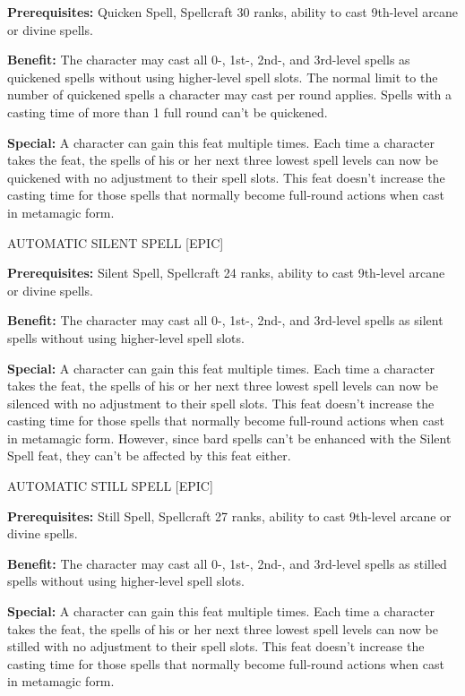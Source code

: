 \documentclass{article}
\begin{document}
\textbf{Prerequisites:} Quicken Spell, Spellcraft 30 ranks, ability to cast 9th-level 
arcane or divine spells. 

\textbf{Benefit:} The character may cast all 0-, 1st-, 2nd-, and 3rd-level spells 
as quickened spells without using higher-level spell slots. The normal limit to 
the number of quickened spells a character may cast per round applies. Spells with 
a casting time of more than 1 full round can't be quickened. 

\textbf{Special:} A character can gain this feat multiple times. Each time a character 
takes the feat, the spells of his or her next three lowest spell levels can now 
be quickened with no adjustment to their spell slots. This feat doesn't increase 
the casting time for those spells that normally become full-round actions when 
cast in metamagic form. 

\vspace{12pt}
AUTOMATIC SILENT SPELL [EPIC] 

\textbf{Prerequisites:} Silent Spell, Spellcraft 24 ranks, ability to cast 9th-level 
arcane or divine spells. 

\textbf{Benefit:} The character may cast all 0-, 1st-, 2nd-, and 3rd-level spells 
as silent spells without using higher-level spell slots. 

\textbf{Special:} A character can gain this feat multiple times. Each time a character 
takes the feat, the spells of his or her next three lowest spell levels can now 
be silenced with no adjustment to their spell slots. This feat doesn't increase 
the casting time for those spells that normally become full-round actions when 
cast in metamagic form. However, since bard spells can't be enhanced with the Silent 
Spell feat, they can't be affected by this feat either. 

\vspace{12pt}
AUTOMATIC STILL SPELL [EPIC] 

\textbf{Prerequisites:} Still Spell, Spellcraft 27 ranks, ability to cast 9th-level 
arcane or divine spells. 

\textbf{Benefit:} The character may cast all 0-, 1st-, 2nd-, and 3rd-level spells 
as stilled spells without using higher-level spell slots. 

\textbf{Special:} A character can gain this feat multiple times. Each time a character 
takes the feat, the spells of his or her next three lowest spell levels can now 
be stilled with no adjustment to their spell slots. This feat doesn't increase 
the casting time for those spells that normally become full-round actions when 
cast in metamagic form. 
\end{document}
